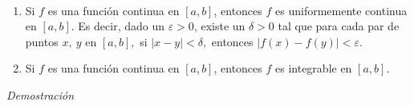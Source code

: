 \begin{teorema}
\leavevmode\\[-1.2ex] %
\renewcommand{\labelenumi}{\textup{\theenumi.}}
\begin{enumerate}[leftmargin=1.2em,   itemindent=0pt,       labelwidth=\labelwidth,labelsep=0.5em,]
\item \textnormal{Si \textit{$f$} es una función continua en \textit{$[a,b]$}, entonces \textit{$f$} es
uniformemente continua en \textit{$[a,b]$}. Es decir, dado un \textit{$\varepsilon >0$},
existe un \textit{$\delta >0$} tal que para cada par de puntos \textit{$x,\ y$} en \textit{$[a,b],$} si \textit{$\left\vert x-y\right\vert <\delta ,$} entonces \textit{$\left\vert f\left( x\right)-f\left( y\right) \right\vert <\varepsilon .$}}

\item \textnormal{Si \textit{$f$} es una función continua en \textit{$[a,b]$}, entonces \textit{$f$} es integrable en \textit{$[a,b].$}}
\end{enumerate}
\end{teorema}


\textit{Demostración}


